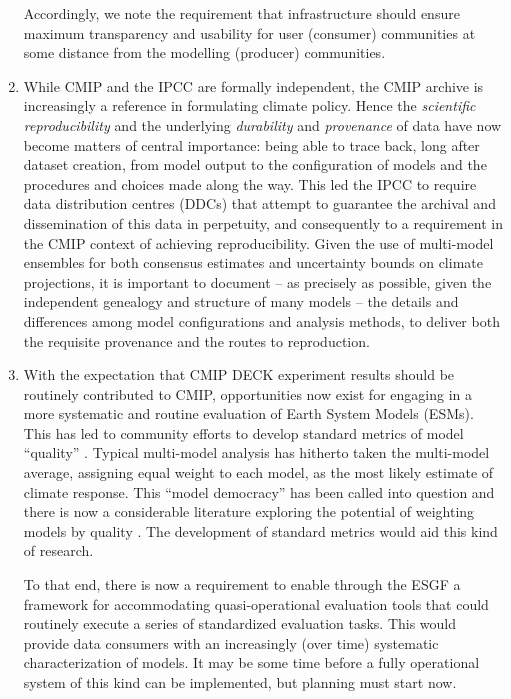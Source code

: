 \documentclass[gmd,manuscript]{copernicus}
\begin{document}
\begin{enumerate}
  Accordingly, we note the requirement that infrastructure should
  ensure maximum transparency and usability for user (consumer)
  communities at some distance from the modelling (producer)
  communities.
\item\label{repro} While CMIP and the IPCC are formally independent,
  the CMIP archive is increasingly a reference in formulating climate
  policy. Hence the \emph{scientific reproducibility}
  \citep{ref:collinstabak2014} and the underlying \emph{durability}
  and \emph{provenance} of data have now become matters of central
  importance: being able to trace back, long after dataset creation,
  from model output to the configuration of models and the procedures
  and choices made along the way. This led the IPCC to require data
  distribution centres (DDCs) that attempt to guarantee the archival
  and dissemination of this data in perpetuity, and consequently to a
  requirement in the CMIP context of achieving reproducibility. Given
  the use of multi-model ensembles for both consensus estimates and
  uncertainty bounds on climate projections, it is important to
  document -- as precisely as possible, given the independent
  genealogy and structure of many models -- the details and
  differences among model configurations and analysis methods, to
  deliver both the requisite provenance and the routes to
  reproduction.
\item\label{analysis} With the expectation that CMIP DECK experiment
  results should be routinely contributed to CMIP, opportunities now
  exist for engaging in a more systematic and routine evaluation of
  Earth System Models (ESMs). This has led to community efforts to
  develop standard metrics of model ``quality''
  \citep{ref:eyringetal2016,ref:gleckleretal2016}. Typical multi-model
  analysis has hitherto taken the multi-model average, assigning equal
  weight to each model, as the most likely estimate of climate
  response. This ``model democracy'' \citep{ref:knutti2010} has been
  called into question and there is now a considerable literature
  exploring the potential of weighting models by quality
  \citep{ref:knuttietal2017}. The development of standard metrics
  would aid this kind of research.

  To that end, there is now a requirement to enable through the ESGF a
  framework for accommodating quasi-operational evaluation tools that
  could routinely execute a series of standardized evaluation tasks.
  This would provide data consumers with an increasingly (over time)
  systematic characterization of models. It may be some time before a
  fully operational system of this kind can be implemented, but
  planning must start now.


\end{enumerate}
\end{document}
